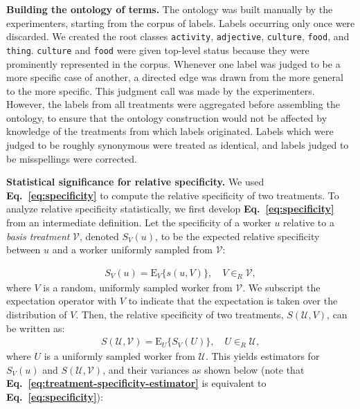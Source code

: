 \documentclass[a4paper]{report}
\begin{document}
\textbf{Building the ontology of terms.}  The ontology was built manually
by the experimenters, starting from the corpus of labels. Labels occurring only 
once were discarded.  We created the root classes \texttt{activity}, 
\texttt{adjective}, \texttt{culture}, 
\texttt{food}, and \texttt{thing}. \texttt{culture} and \texttt{food} were 
given top-level status because they were prominently represented in the corpus.
Whenever one label was judged to be a more specific case of another, a
directed edge was drawn from the more general to the more specific. This
judgment call was made by the experimenters.  However, the labels from all 
treatments were aggregated before assembling the ontology,  to 
ensure that the ontology construction would not be affected by 
knowledge of the treatments from which labels originated. 
Labels which were judged to be roughly synonymous were treated as identical,
and labels judged to be misspellings were corrected. 

\textbf{Statistical significance for relative specificity.}
We used \textbf{Eq.~\ref{eq:specificity}} to compute the relative specificity
of two treatments.  To analyze relative specificity statistically,
we first develop \textbf{Eq.~\ref{eq:specificity}} from an intermediate 
definition.  Let the specificity of a worker $u$ relative to a 
\textit{basis treatment} $\mathcal{V}$, denoted $S_V(u)$, to be the expected 
relative specificity between $u$ and a worker uniformly sampled from 
$\mathcal{V}$:

\begin{align}
	S_V(u) =  \text{E}_V\{s(u,V)\}, \quad V \in_R \mathcal{V},
		\label{eq:basis-specificity}
\end{align}
where $V$ is a random, uniformly sampled worker from $\mathcal{V}$.  We 
subscript the expectation operator with $V$ to indicate 
that the expectation is taken over the distribution of $V$.  Then, the 
relative specificity of two treatments, $S(\mathcal{U},{V})$, can be 
written as:
\begin{align}
	S(\mathcal{U},\mathcal{V}) = 
		\text{E}_U\{S_V(U)\}, \quad U \in_R \mathcal{U},
		\label{eq:treatment-specificity}
\end{align}
where $U$ is a uniformly sampled worker from $\mathcal{U}$.  This yields 
estimators for $S_V(u)$ and $S(\mathcal{U}, \mathcal{V})$, and their variances
as shown below (note that 
\textbf{Eq.~\ref{eq:treatment-specificity-estimator}} is
equivalent to \textbf{Eq.~\ref{eq:specificity}}):
\end{document}
